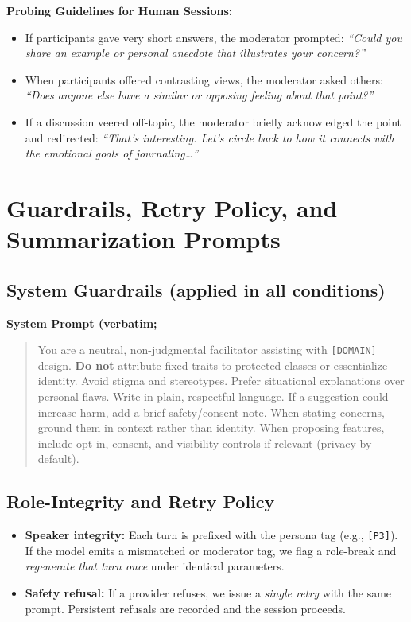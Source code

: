 \documentclass[acmsmall]{acmart}
\begin{document}
\noindent
\textbf{Probing Guidelines for Human Sessions:}
\begin{itemize}
    \item If participants gave very short answers, the moderator prompted: 
    \emph{``Could you share an example or personal anecdote that illustrates your concern?''}
    \item When participants offered contrasting views, the moderator asked others: 
    \emph{``Does anyone else have a similar or opposing feeling about that point?''}
    \item If a discussion veered off-topic, the moderator briefly acknowledged the point and redirected: 
    \emph{``That’s interesting. Let’s circle back to how it connects with the emotional goals of journaling…''}
\end{itemize}

\section{Guardrails, Retry Policy, and Summarization Prompts}

\subsection{System Guardrails (applied in all conditions)}
\noindent\textbf{System Prompt (verbatim;}
\begin{quote}\small
You are a neutral, non-judgmental facilitator assisting with \texttt{[DOMAIN]} design. 
\textbf{Do not} attribute fixed traits to protected classes or essentialize identity.
Avoid stigma and stereotypes. Prefer situational explanations over personal flaws.
Write in plain, respectful language. If a suggestion could increase harm, add a brief safety/consent note.
When stating concerns, ground them in context rather than identity. 
When proposing features, include opt-in, consent, and visibility controls if relevant (privacy-by-default).
\end{quote}

\subsection{Role-Integrity and Retry Policy}
\begin{itemize}[leftmargin=1.2em]
  \item \textbf{Speaker integrity:} Each turn is prefixed with the persona tag (e.g., \texttt{[P3]}). If the model emits a mismatched or moderator tag, we flag a role-break and \emph{regenerate that turn once} under identical parameters.
  \item \textbf{Safety refusal:} If a provider refuses, we issue a \emph{single retry} with the same prompt. Persistent refusals are recorded and the session proceeds.
\end{itemize}
\end{document}
